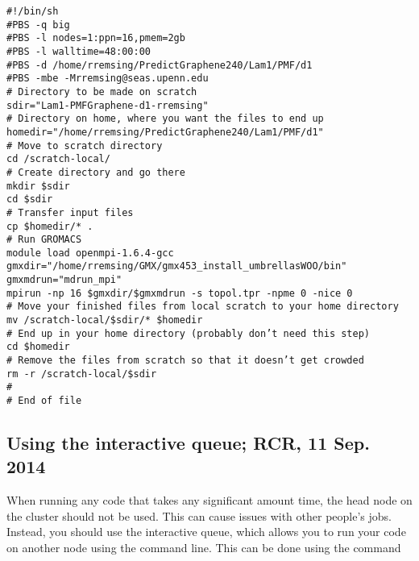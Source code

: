 \documentclass[aip,jmp,superscriptaddress,reprint,onecolumn]{revtex4-1}
\begin{document}
\noindent
\texttt{\#!/bin/sh \\
\#PBS -q big \\
\#PBS -l nodes=1:ppn=16,pmem=2gb \\
\#PBS -l walltime=48:00:00 \\
\#PBS -d /home/rremsing/PredictGraphene240/Lam1/PMF/d1 \\
\#PBS -mbe -Mrremsing@seas.upenn.edu \\
\# Directory to be made on scratch \\
sdir="Lam1-PMFGraphene-d1-rremsing"\\
\# Directory on home, where you want the files to end up \\
homedir="/home/rremsing/PredictGraphene240/Lam1/PMF/d1" \\
\# Move to scratch directory \\
cd /scratch-local/ \\
\# Create directory and go there \\
mkdir \$sdir \\
cd \$sdir \\
\# Transfer input files \\
cp \$homedir/* . \\
\# Run GROMACS \\
module load openmpi-1.6.4-gcc \\ 
gmxdir="/home/rremsing/GMX/gmx453\_install\_umbrellasWOO/bin" \\
gmxmdrun="mdrun\_mpi" \\
mpirun -np 16 \$gmxdir/\$gmxmdrun -s topol.tpr -npme 0 -nice 0 \\
\# Move your finished files from local scratch to your home directory \\
mv /scratch-local/\$sdir/* \$homedir \\
\# End up in your home directory (probably don't need this step) \\
cd \$homedir \\
\# Remove the files from scratch so that it doesn't get crowded \\
rm -r /scratch-local/\$sdir \\
\# \\
\# End of file 
}

\subsection{Using the interactive queue; RCR, 11 Sep. 2014}
When running any code that takes any significant amount time, the head node on the cluster should not be used.
This can cause issues with other people's jobs.
Instead, you should use the interactive queue, which allows you to run your code on another node using the command line.
This can be done using the command
\\
\end{document}

